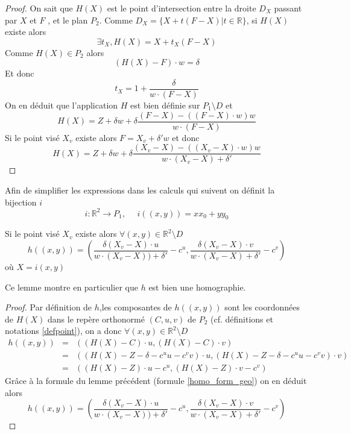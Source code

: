 \begin{proof}
On sait que $H(X)$ est le point d'intersection entre la droite $D_X$ passant par $X$ et $F$ , et le plan $P_2$.
Comme $D_{X}=\{X+t(F-X)|t\in\mathbb{R}\}$, si $H(X)$ existe alors 
\begin{equation*}
\exists t_{X},H(X)=X+t_{X}(F-X)
\end{equation*}
Comme $H(X)\in P_{2}$ alors
\begin{equation*}
(H(X)-F)\cdot w =\delta
\end{equation*}
Et donc 
\begin{equation*}
t_{X}=1+\frac{\delta}{w\cdot(F-X)}
\end{equation*}
 On en déduit que l'application $H$ est bien définie sur $P_{1}\setminus D$ et 
\begin{equation*}
H(X)=Z+\delta w+\delta \frac{(F-X)-\left((F-X)\cdot w\right) w}{w\cdot (F-X)}
\end{equation*}
Si le point visé $X_v$ existe alors  $F=X_v+\delta' w$ et donc
\begin{equation*}
H(X)=Z+\delta w+\delta \frac{(X_v-X)-\left((X_v-X)\cdot w\right) w}{w\cdot (X_v-X)+\delta'}
\end{equation*}
\end{proof}
Afin de simplifier les expressions dans les calculs qui suivent on définit la bijection $i$ 
\begin{equation*}
i:\mathbb{R}^{2}\rightarrow P_{1},~~~~~~i((x,y))=xx_{0}+yy_{0}
\end{equation*}

\begin{lem}Si le point visé $X_v$ existe alors $\forall (x,y)\in \mathbb{R}^{2} \setminus D$ 
\begin{equation}
h((x,y))=\left(\frac{\delta (X_{v}-X)\cdot u}{w \cdot (X_v-X))+\delta'}-c^u,\frac{\delta (X_v-X)\cdot v}{w \cdot (X_v-X)+\delta'} -c^v \right) 
\label{homo_form_analytique}
\end{equation}
où $X=i(x,y)$
\end{lem}
Ce lemme montre en particulier que $h$ est bien une homographie.
\begin{proof}
Par définition de $h$,les composantes de $h((x,y))$ sont les coordonnées de $H(X)$ dans le repère orthonormé $(C,u,v)$ de $P_2$ (cf. définitions et notations \ref{defpoint}), on a donc $ \forall (x,y)\in \mathbb{R}^{2} \setminus D$
\begin{eqnarray*}
h((x,y)) &=& ((H(X)-C)\cdot u, (H(X)-C)\cdot v)\\
     &=& ((H(X)-Z-\delta -c^u u -c^v v)\cdot u, (H(X)-Z-\delta -c^u u -c^v v)\cdot v)\\
     &=& ((H(X)-Z)\cdot u -c^u, (H(X)-Z)\cdot v - c^v)
\end{eqnarray*}
Grâce à la formule du lemme précédent (formule \ref{homo_form_geo}) on en déduit alors 
\begin{equation*}
h((x,y))=\left(\frac{\delta (X_v-X)\cdot u}{w \cdot (X_v-X))+\delta'}-c^u,\frac{\delta (X_v-X)\cdot v}{w \cdot (X_v-X)+\delta'} -c^v \right) 
\end{equation*}
\end{proof}

